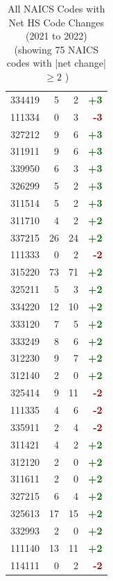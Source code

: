 \documentclass[11pt]{article}
\begin{document}
\begin{table}[H]
\begin{minipage}{0.48\textwidth}
\begin{tabular}{lrrr}
334419 & 5 & 2 & \textcolor{darkgreen}{\textbf{+3}} \\
111334 & 0 & 3 & \textcolor{darkred}{\textbf{-3}} \\
327212 & 9 & 6 & \textcolor{darkgreen}{\textbf{+3}} \\
311911 & 9 & 6 & \textcolor{darkgreen}{\textbf{+3}} \\
339950 & 6 & 3 & \textcolor{darkgreen}{\textbf{+3}} \\
326299 & 5 & 2 & \textcolor{darkgreen}{\textbf{+3}} \\
311514 & 5 & 2 & \textcolor{darkgreen}{\textbf{+3}} \\
311710 & 4 & 2 & \textcolor{darkgreen}{\textbf{+2}} \\
337215 & 26 & 24 & \textcolor{darkgreen}{\textbf{+2}} \\
111333 & 0 & 2 & \textcolor{darkred}{\textbf{-2}} \\
315220 & 73 & 71 & \textcolor{darkgreen}{\textbf{+2}} \\
325211 & 5 & 3 & \textcolor{darkgreen}{\textbf{+2}} \\
334220 & 12 & 10 & \textcolor{darkgreen}{\textbf{+2}} \\
333120 & 7 & 5 & \textcolor{darkgreen}{\textbf{+2}} \\
333249 & 8 & 6 & \textcolor{darkgreen}{\textbf{+2}} \\
312230 & 9 & 7 & \textcolor{darkgreen}{\textbf{+2}} \\
312140 & 2 & 0 & \textcolor{darkgreen}{\textbf{+2}} \\
325414 & 9 & 11 & \textcolor{darkred}{\textbf{-2}} \\
111335 & 4 & 6 & \textcolor{darkred}{\textbf{-2}} \\
335911 & 2 & 4 & \textcolor{darkred}{\textbf{-2}} \\
311421 & 4 & 2 & \textcolor{darkgreen}{\textbf{+2}} \\
312120 & 2 & 0 & \textcolor{darkgreen}{\textbf{+2}} \\
311611 & 2 & 0 & \textcolor{darkgreen}{\textbf{+2}} \\
327215 & 6 & 4 & \textcolor{darkgreen}{\textbf{+2}} \\
325613 & 17 & 15 & \textcolor{darkgreen}{\textbf{+2}} \\
332993 & 2 & 0 & \textcolor{darkgreen}{\textbf{+2}} \\
111140 & 13 & 11 & \textcolor{darkgreen}{\textbf{+2}} \\
114111 & 0 & 2 & \textcolor{darkred}{\textbf{-2}} \\
\bottomrule
\end{tabular}
\end{minipage}
\caption{All NAICS Codes with Net HS Code Changes (2021 to 2022) (showing 75 NAICS codes with |net change| $\geq 2$ )}
\end{table}
\end{document}
